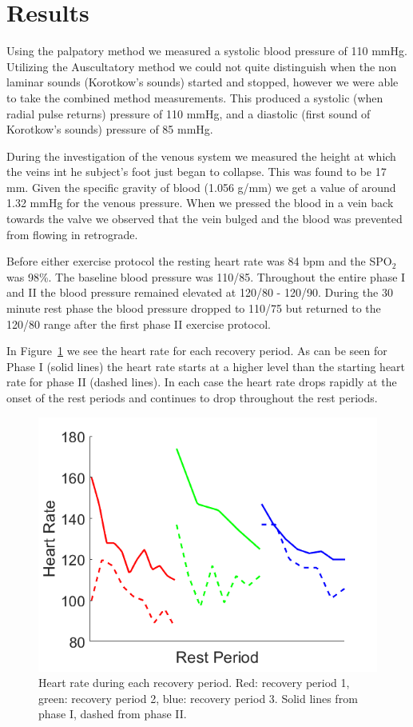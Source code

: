 \documentclass[12pt]{article}
\newcommand{\spo}{{SPO$_2$}}
\begin{document}
\section{Results}
Using the palpatory method we measured a systolic blood pressure of 110 mmHg. Utilizing the Auscultatory method we could not quite distinguish when the non laminar sounds (Korotkow's sounds) started and stopped, however we were able to take the combined method measurements. This produced a systolic (when radial pulse returns) pressure of 110 mmHg, and a diastolic (first sound of Korotkow's sounds) pressure of 85 mmHg.

During the investigation of the venous system we measured the height at which the veins int he subject's foot just began to collapse. This was found to be 17 mm. Given the specific gravity of blood (1.056 g/mm) we get a value of around 1.32 mmHg for the venous pressure. When we pressed the blood in a vein back towards the valve we observed that the vein bulged and the blood was prevented from flowing in retrograde.

Before either exercise protocol the resting heart rate was 84 bpm and the \spo{} was 98\%. The baseline blood pressure was 110/85. Throughout the entire phase I and II the blood pressure remained elevated at 120/80 - 120/90. During  the 30 minute rest phase the blood pressure dropped to 110/75 but returned to the 120/80 range after the first phase II exercise protocol.

In Figure~\ref{HR} we see the heart rate for each recovery period. As can be seen for Phase I (solid lines) the heart rate starts at a higher level than the starting heart rate for phase II (dashed lines). In each case the heart rate drops rapidly at the onset of the rest periods and continues to drop throughout the rest periods. 

\begin{figure}[H]
	
	\centering
	\includegraphics[width = .8\textwidth]{Figures/HR.png}
	\caption{Heart rate during each recovery period. Red: recovery period 1, green: recovery period 2, blue: recovery period 3. Solid lines from phase I, dashed from phase II.}
	\label{HR}
\end{figure}
\end{document}
